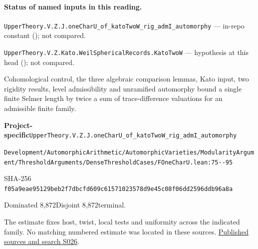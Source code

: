 

\paragraph{Status of named inputs in this reading.}
\noindent\nolinkurl{UpperTheory.V.Z.J.oneCharU_of_katoTwoW_rig_admI_automorphy} --- in-repo constant (); not compared.\par
\noindent\nolinkurl{UpperTheory.V.Z.Kato.WeilSphericalRecords.KatoTwoW} --- hypothesis at this head (); not compared.\par

\begin{formalstatement}[D528]\label{decomp:D528}
Cohomological control, the three algebraic comparison lemmas, Kato input, two rigidity results, level admissibility and unramified automorphy bound a single finite Selmer length by twice a sum of trace-difference valuations for an admissible finite family.
\end{formalstatement}
{\small\raggedright\noindent\textsf{\bfseries Project-specific}\quad \nolinkurl{UpperTheory.V.Z.J.oneCharU_of_katoTwoW_rig_admI_automorphy}\par\noindent \nolinkurl{Development/AutomorphicArithmetic/AutomorphicVarieties/ModularityArgument/ThresholdArguments/DenseThresholdCases/FOneCharU.lean:75--95}\par\noindent SHA-256 \nolinkurl{f05a9eae95129beb2f7dbcfd609c61571023578d9e45c08f06dd2596ddb96a8a}\par\noindent Dominated 8,872\quad Disjoint 8,872\quad terminal.\par}
The estimate fixes host, twist, local tests and uniformity across the indicated family. No matching numbered estimate was located in these sources.
\hyperref[lit:S026]{Published sources and search S026}.
